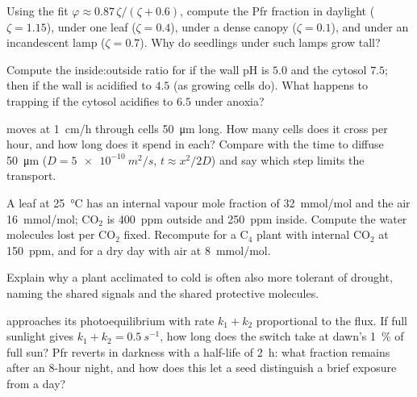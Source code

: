 \begin{exercise}[$\star\star$]\label{exo:b3:plant-molecular-physiology:5}
Using the fit $\varphi \approx 0.87\,\zeta/(\zeta + 0.6)$, compute the
Pfr fraction in daylight ($\zeta = 1.15$), under one leaf ($\zeta =
0.4$), under a dense canopy ($\zeta = 0.1$), and under an incandescent
lamp ($\zeta = 0.7$). Why do seedlings under such lamps grow tall?
\end{exercise}

\begin{exercise}[$\star\star$]\label{exo:b3:plant-molecular-physiology:6}
Compute the inside:outside ratio for  if the wall pH is $5.0$ and
the cytosol $7.5$; then if the wall is acidified to $4.5$ (as growing
cells do). What happens to trapping if the cytosol acidifies to $6.5$
under anoxia?
\end{exercise}

\begin{exercise}[$\star\star$]\label{exo:b3:plant-molecular-physiology:7}
 moves at \qty{1}{cm/h} through cells \qty{50}{\micro m} long. How
many cells does it cross per hour, and how long does it spend in each?
Compare with the time to diffuse \qty{50}{\micro m} ($D =
\qty{5e-10}{m^2/s}$, $t \approx x^{2}/2D$) and say which step limits
the transport.
\end{exercise}

\begin{exercise}[$\star\star$]\label{exo:b3:plant-molecular-physiology:8}
A leaf at \qty{25}{\celsius} has an internal vapour mole fraction of
\qty{32}{mmol/mol} and the air \qty{16}{mmol/mol}; CO$_{2}$ is
\qty{400}{ppm} outside and \qty{250}{ppm} inside. Compute the water
molecules lost per CO$_{2}$ fixed. Recompute for a C$_{4}$ plant with
internal CO$_{2}$ at \qty{150}{ppm}, and for a dry day with air at
\qty{8}{mmol/mol}.
\end{exercise}

\begin{exercise}[$\star\star$]\label{exo:b3:plant-molecular-physiology:9}
Explain why a plant acclimated to cold is often also more tolerant of
drought, naming the shared signals and the shared protective molecules.
\end{exercise}

\begin{exercise}[$\star\star\star$]\label{exo:b3:plant-molecular-physiology:10}
 approaches its photoequilibrium with rate $k_{1} + k_{2}$
proportional to the flux. If full sunlight gives $k_{1} + k_{2} =
\qty{0.5}{s^{-1}}$, how long does the switch take at dawn's
\qty{1}{\%} of full sun? Pfr reverts in darkness with a half-life of
\qty{2}{h}: what fraction remains after an 8-hour night, and how does
this let a seed distinguish a brief exposure from a day?
\end{exercise}

